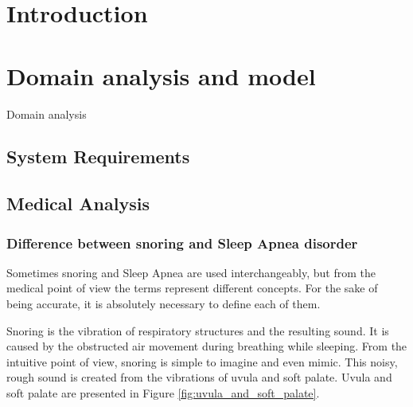\documentclass[12pt,a4paper]{report}
\begin{document}
\pagestyle{plain}
\renewcommand{\chaptername}{}

\begin{singlespacing}
\tableofcontents
\end{singlespacing}


\chapter*{Introduction}

\chapter{Domain analysis and model}
Domain analysis
\section{System Requirements}
\section{Medical Analysis}
\subsection{Difference between snoring and Sleep Apnea disorder}
Sometimes snoring and Sleep Apnea are used interchangeably, but from the medical point of view the terms represent different concepts. For the sake of being accurate, it is absolutely necessary to define each of them.

Snoring is the vibration of respiratory structures and the resulting sound. It is caused by the obstructed air movement during breathing while sleeping. From the intuitive point of view, snoring is simple to imagine and even mimic. This noisy, rough sound is created from the vibrations of uvula and soft palate. Uvula and soft palate are presented in Figure \ref{fig:uvula_and_soft_palate}.
\end{document}
